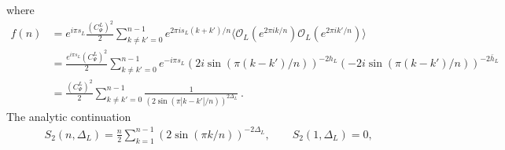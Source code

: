 \documentclass[11pt]{article}
\newcommand{\mO}{\mathcal{O}}
\newcommand{\nn}{\nonumber}
\begin{document}
where
  \begin{align}\label{fnexpression1}
    f(n) & =e^{i\pi s_L} \frac{{(C_{\Psi}^L)}^{2}}{2}\sum_{k\neq k'=0}^{n-1}e^{2\pi i s_L (k+k')/n}\langle \mO_{L}(e^{2\pi i k/n})\mO_{L}(e^{2\pi i k'/n})\rangle \nn    \\
    &=\frac{e^{i\pi s_L} {(C_{\Psi}^L)}^{2}}{2}\sum_{k\neq k'=0}^{n-1}e^{-i\pi s_L}(2i\sin(\pi(k-k')/n))^{-2h_L}(-2i\sin(\pi(k-k')/n))^{-2\bar{h}_L}\nn\\
         & =\frac{{(C_{\Psi}^L)}^{2}}{2}\sum_{k\neq k'=0}^{n-1}\frac{1}{(2\sin(\pi |k-k'|/n))^{2\Delta_L}}\ .
  \end{align}
  The analytic continuation
  \begin{align}
     & S_{2}(n,\Delta_L)=\frac{n}{2}\sum_{k=1}^{n-1}(2\sin(\pi k/n))^{-2\Delta_L},\qquad S_{2}(1,\Delta_L)=0,
  \end{align}
\end{document}
